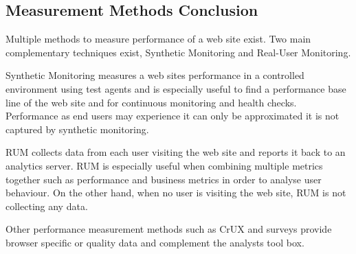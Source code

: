 





\subsection{Measurement Methods Conclusion}


Multiple methods to measure performance of a web site exist.
Two main complementary techniques exist, Synthetic Monitoring and Real-User Monitoring.

Synthetic Monitoring measures a web sites performance in a controlled environment using test agents and is especially useful to find a performance base line of the web site and for continuous monitoring and health checks.
Performance as end users may experience it can only be approximated it is not captured by synthetic monitoring.

RUM collects data from each user visiting the web site and reports it back to an analytics server.
RUM is especially useful when combining multiple metrics together such as performance and business metrics in order to analyse user behaviour.
On the other hand, when no user is visiting the web site, RUM is not collecting any data.

Other performance measurement methods such as CrUX and surveys provide browser specific or quality data and complement the analysts tool box.



